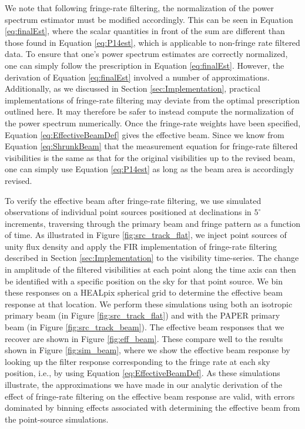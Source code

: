 \documentclass[twocolumn,apj,numberedappendix]{emulateapj}
\begin{document}
We note that following fringe-rate filtering, the normalization of the power
spectrum estimator must be modified accordingly. This can be seen in Equation
\eqref{eq:finalEst}, where the scalar quantities in front of the sum are
different than those found in Equation \eqref{eq:P14est}, which is applicable
to non-fringe rate filtered data. To ensure that one's power spectrum estimates
are correctly normalized, one can simply follow the prescription in Equation
\eqref{eq:finalEst}. However, the derivation of Equation \eqref{eq:finalEst}
involved a number of approximations. Additionally, as we discussed in Section
\ref{sec:Implementation}, practical implementations of fringe-rate filtering
may deviate from the optimal prescription outlined here. It may therefore be
safer to instead compute the normalization of the power spectrum numerically.
Once the fringe-rate weights have been specified, Equation
\eqref{eq:EffectiveBeamDef} gives the effective beam. Since we know from
Equation \eqref{eq:ShrunkBeam} that the measurement equation for fringe-rate
filtered visibilities is the same as that for the original visibilities up to
the revised beam, one can simply use Equation \eqref{eq:P14est} as long as the
beam area is accordingly revised.

To verify the effective beam after fringe-rate filtering, we use simulated observations 
of individual point sources positioned at declinations in $5^\circ$ increments, traversing
through the primary beam and fringe pattern as a function of time.  As
illustrated in Figure \ref{fig:src_track_flat}, we inject point sources of unity
flux density and apply the FIR implementation of fringe-rate filtering described in Section \ref{sec:Implementation}
to the visibility time-series.  The change in amplitude of the filtered visibilities at each point
along the time axis can then be 
identified with a specific position on the sky for that point source.  We bin these responses on a
HEALpix spherical grid \citep{gorski_et_al2005} to determine the effective beam response
at that location.  We perform these simulations using both an isotropic primary beam (in Figure \ref{fig:src_track_flat})
and with the PAPER primary beam (in Figure \ref{fig:src_track_beam}).  
The effective beam responses that
we recover are shown in Figure \ref{fig:eff_beam}.  These compare well to the results shown in Figure \ref{fig:sim_beam}, 
where we show the effective beam response by looking up the filter response corresponding
to the fringe rate at each sky position, i.e., by using Equation \eqref{eq:EffectiveBeamDef}.  As these simulations illustrate, the approximations we have made in our analytic
derivation of the effect of fringe-rate filtering on the effective beam response are valid, with errors 
dominated by binning effects associated with determining the effective beam from the point-source simulations.
\end{document}
